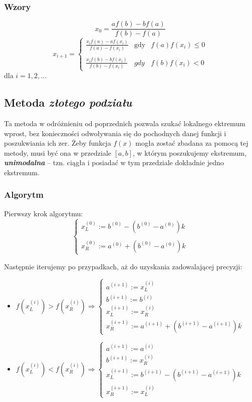 \documentclass[a4paper,11pt]{article}
\begin{document}
  \subsubsection{Wzory}
    $$ x_{0}=\frac{af(b)-bf(a)}{f(b)-f(a)} $$
    $$ x_{i+1}= \left \{ \begin{array}{lll} 
    \displaystyle{\frac {x_i f(a) - a f(x_i)} {f(a) - f(x_i)}} & \textrm{gdy} & f(a)f(x_i) \le 0 \\ \\
    \frac {x_i f(b) - b f(x_i)} {f(b) - f(x_i)} & gdy & f(b)f(x_i) < 0 
  \end{array}\right. $$
  dla \( i = 1,2,... \)
  
  \subsection{Metoda \emph{złotego podziału}}
    Ta metoda w odróżnieniu od poprzednich pozwala szukać lokalnego ektremum wprost, bez konieczności odwoływania się do pochodnych danej funkcji i poszukwiania ich zer. Żeby funkcja \( f(x) \) mogła zostać zbadana za pomocą tej metody, musi być ona w przedziale \( [a,b] \), w którym poszukujemy ekstremum, \textbf{\emph{unimodalna}} -- tzn. ciągła i posiadać w tym przedziale dokładnie jedno ekstremum.
    \subsubsection{Algorytm}
    Pierwszy krok algorytmu:
    $$ \left\{\begin{array}{l}
    x_L^{(0)} := b^{(0)} - (b^{(0)}-a^{(0)})k \\ \\
    x_R^{(0)} := a^{(0)} + (b^{(0)}-a^{(0)})k
    \end{array}\right. $$
    
    Następnie iterujemy po przypadkach, aż do uzyskania zadowalającej precyzji:
    \begin{itemize}
      \item \( f(x_L^{(i)}) > f(x_R^{(i)}) \Rightarrow \left\{\begin{array}{l}
        a^{(i+1)} := x_L^{(i)} \\
        b^{(i+1)} := b^{(i)} \\
        x_L^{(i+1)} := x_R^{(i)} \\
        x_R^{(i+1)} := a^{(i+1)} + (b^{(i+1)}-a^{(i+1)})k
        \end{array}\right. \)
      \item \( f(x_L^{(i)}) < f(x_R^{(i)}) \Rightarrow \left\{\begin{array}{l}
        a^{(i+1)} := a^{(i)} \\
        b^{(i+1)} := x_R^{(i)} \\
        x_L^{(i+1)} := b^{(i+1)} - (b^{(i+1)}-a^{(i+1)})k \\
        x_R^{(i+1)} := x_L^{(i)}
        \end{array}\right. \)
    \end{itemize}
    
  
    
\end{document}
